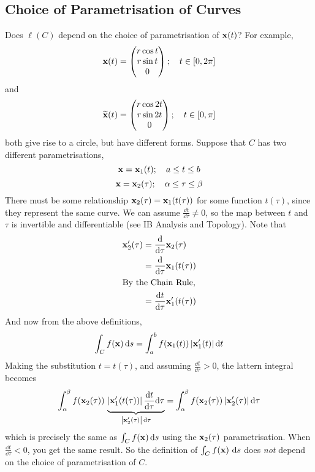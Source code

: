 \subsection{Choice of Parametrisation of Curves}
Does $\ell(C)$ depend on the choice of parametrisation of $\vb x(t)$? For example,
\[ \vb x(t) = \begin{pmatrix}
		r\cos t \\ r \sin t \\ 0
	\end{pmatrix};\quad t \in [0, 2\pi] \]
and
\[ \widetilde{\vb x}(t) = \begin{pmatrix}
		r\cos 2t \\ r \sin 2t \\ 0
	\end{pmatrix};\quad t \in [0, \pi] \]
both give rise to a circle, but have different forms. Suppose that $C$ has two different parametrisations,
\[ \vb x = \vb x_1(t);\quad a \leq t \leq b \]
\[ \vb x = \vb x_2(\tau);\quad \alpha \leq \tau \leq \beta \]
There must be some relationship $\vb x_2(\tau) = \vb x_1(t(\tau))$ for some function $t(\tau)$, since they represent the same curve. We can assume $\frac{\dd{t}}{\dd \tau} \neq 0$, so the map between $t$ and $\tau$ is invertible and differentiable (see IB Analysis and Topology). Note that
\begin{align*}
	\vb x_2'(\tau) & = \frac{\dd}{\dd \tau}\vb x_2(\tau)        \\
	               & = \frac{\dd}{\dd \tau}\vb x_1(t(\tau))     \\
	\intertext{By the Chain Rule,}
	               & = \frac{\dd{t}}{\dd \tau}\vb x_1'(t(\tau))
\end{align*}
And now from the above definitions,
\[ \int_C f(\vb x) \dd{s} = \int_a^b f(\vb x_1(t)) \, \abs{\vb x_1'(t)} \dd{t} \]
Making the substitution $t = t(\tau)$, and assuming $\frac{\dd{t}}{\dd \tau} > 0$, the lattern integral becomes
\[ \int_\alpha^\beta f(\vb x_2(\tau)) \, \underbrace{\abs{\vb x_1'(t(\tau))} \,\frac{\dd{t}}{\dd \tau}\dd \tau}_{\abs{\vb x_2'(\tau)}\,\dd \tau} = \int_\alpha^\beta f(\vb x_2(\tau)) \, \abs{\vb x_2'(\tau)} \,\dd \tau \]
which is precisely the same as $\int_C f(\vb x) \dd{s}$ using the $\vb x_2(\tau)$ parametrisation. When $\frac{\dd{t}}{\dd \tau} < 0$, you get the same result. So the definition of $\int_C f(\vb x) \, \dd{s}$ does \textit{not} depend on the choice of parametrisation of $C$.

